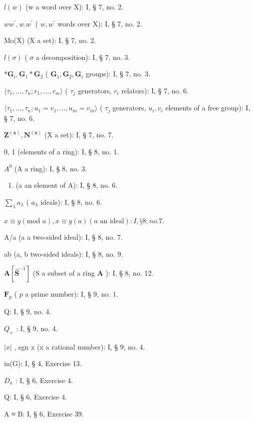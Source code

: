 \(l(w)\) (w a word over X): I, § 7, no. 2.

\(ww^{\prime}, w.w^{\prime}\) ( \(w, w^{\prime}\) words over X): I, § 7, no. 2.

Mo(X) (X a set): I, § 7, no. 2.

\(l(\sigma)\) ( \(\sigma\) a decomposition): I, § 7, no. 3.

\(*\mathbf{G}_i,\mathbf{G}_1*\mathbf{G}_2\) ( \(\mathbf{G}_1,\mathbf{G}_2,\mathbf{G}_i\) groups): I, § 7, no. 3.

\(\langle \tau_{1},\ldots ,\tau_{n};r_{1},\ldots ,r_{m}\rangle\) ( \(\tau_{j}\) generators, \(r_i\) relators): I, § 7, no. 6.

\(\langle \tau_{1},\ldots ,\tau_{n};u_{1} = v_{1},\ldots ,u_{m} = v_{m}\rangle\) ( \(\tau_{j}\) generators, \(u_{i},v_{i}\) elements of a free group): I, § 7, no. 6.

\(\mathbf{Z}^{(\mathbf{x})}, \mathbf{N}^{(\mathbf{x})}\) (X a set): I, § 7, no. 7.

0, 1 (elements of a ring): I, § 8, no. 1.

\(A^{0}\) (A a ring): I, § 8, no. 3.

\begin{enumerate}
\def\labelenumi{(\alph{enumi})}
\tightlist
\item
  (a an element of A): I, § 8, no. 6.
\end{enumerate}

\(\sum_{\lambda} a_{\lambda}\) ( \(a_{\lambda}\) ideals): I, § 8, no. 6.

\(x \equiv y (\text{mod } a), x \equiv y (a) (a \text{ an ideal}): I, § 8, no. 7.\)

A/a (a a two-sided ideal): I, § 8, no. 7.

ab (a, b two-sided ideals): I, § 8, no. 9.

\(\mathbf{A}[\hat{\mathbf{S}}^{-1}]\) (S a subset of a ring \(\mathbf{A}\) ): I, § 8, no. 12.

\(\mathbf{F}_p\) ( \(p\) a prime number): I, § 9, no. 1.

Q: I, § 9, no. 4.

\(Q_{+}\) : I, § 9, no. 4.

\(|x|\) , sgn x (x a rational number): I, § 9, no. 4.

in(G): I, § 4, Exercise 13.

\(D_{n}\) : I, § 6, Exercise 4.

Q: I, § 6, Exercise 4.

A ≈ B: I, § 6, Exercise 39.


